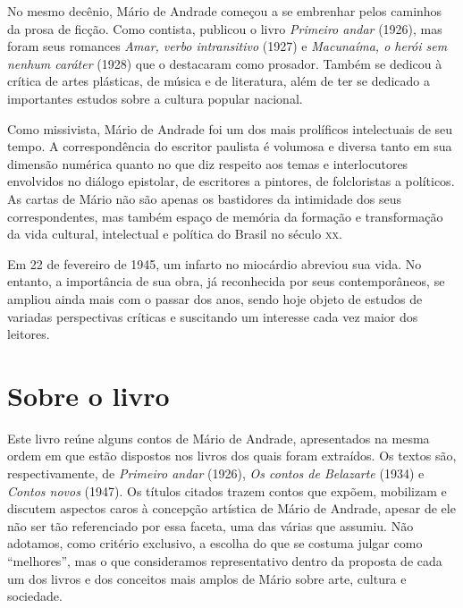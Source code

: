 No mesmo decênio, Mário de Andrade começou a se embrenhar pelos caminhos
da prosa de ficção. Como contista, publicou o livro \emph{Primeiro
andar} (1926), mas foram seus romances \emph{Amar, verbo intransitivo}
(1927) e \emph{Macunaíma, o herói sem nenhum caráter} (1928) que o
destacaram como prosador. Também se dedicou à crítica de artes
plásticas, de música e de literatura, além de ter se dedicado a
importantes estudos sobre a cultura popular nacional.

Como missivista, Mário de Andrade foi um dos mais prolíficos
intelectuais de seu tempo. A correspondência do escritor paulista é
volumosa e diversa tanto em sua dimensão numérica quanto no que diz
respeito aos temas e interlocutores envolvidos no diálogo epistolar, de
escritores a pintores, de folcloristas a políticos. As cartas de Mário
não são apenas os bastidores da intimidade dos seus correspondentes, mas
também espaço de memória da formação e transformação da vida cultural,
intelectual e política do Brasil no século \textsc{xx}.

Em 22 de fevereiro de 1945, um infarto no miocárdio abreviou sua vida.
No entanto, a importância de sua obra, já reconhecida por seus
contemporâneos, se ampliou ainda mais com o passar dos anos, sendo hoje
objeto de estudos de variadas perspectivas críticas e suscitando um
interesse cada vez maior dos leitores.

\section{Sobre o livro}

Este livro reúne alguns contos de Mário de Andrade, apresentados na
mesma ordem em que estão dispostos nos livros dos quais foram extraídos.
Os textos são, respectivamente, de \emph{Primeiro andar} (1926),
\emph{Os contos de Belazarte} (1934) e \emph{Contos novos} (1947). Os
títulos citados trazem contos que expõem, mobilizam e discutem aspectos
caros à concepção artística de Mário de Andrade, apesar de ele não ser
tão referenciado por essa faceta, uma das várias que assumiu. Não
adotamos, como critério exclusivo, a escolha do que se costuma julgar
como ``melhores'', mas o que consideramos representativo dentro da
proposta de cada um dos livros e dos conceitos mais amplos de Mário
sobre arte, cultura e sociedade.

